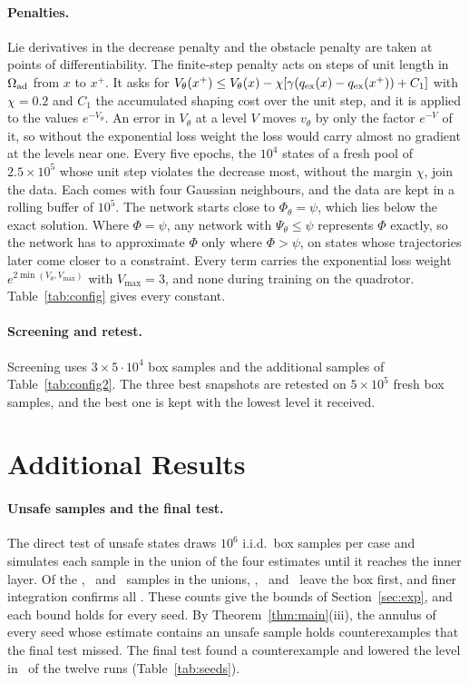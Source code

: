 \paragraph{Penalties.} Lie derivatives in the decrease penalty and the obstacle penalty are taken at points of differentiability. The finite-step penalty acts on steps of unit length in $\Omega_{\mathrm{ad}}$ from $x$ to $x^{+}$. It asks for $V_\theta(x^{+})\le V_\theta(x)-\chi[\gamma(q_{\mathrm{ex}}(x)-q_{\mathrm{ex}}(x^{+}))+C_1]$ with $\chi=0.2$ and $C_1$ the accumulated shaping cost over the unit step, and it is applied to the values $e^{-V_\theta}$. An error in $V_\theta$ at a level $V$ moves $v_\theta$ by only the factor $e^{-V}$ of it, so without the exponential loss weight the loss would carry almost no gradient at the levels near one. Every five epochs, the $10^4$ states of a fresh pool of $2.5\times10^5$ whose unit step violates the decrease most, without the margin $\chi$, join the data. Each comes with four Gaussian neighbours, and the data are kept in a rolling buffer of $10^5$. The network starts close to $\Phi_\theta=\psi$, which lies below the exact solution. Where $\Phi=\psi$, any network with $\Psi_\theta\le\psi$ represents $\Phi$ exactly, so the network has to approximate $\Phi$ only where $\Phi>\psi$, on states whose trajectories later come closer to a constraint. Every term carries the exponential loss weight $e^{2\min(V_\theta,V_{\max})}$ with $V_{\max}=3$, and none during training on the quadrotor. Table~\ref{tab:config} gives every constant.

\paragraph{Screening and retest.} Screening uses $3\times5\cdot10^4$ box samples and the additional samples of Table~\ref{tab:config2}. The three best snapshots are retested on $5\times10^5$ fresh box samples, and the best one is kept with the lowest level it received.


\section{Additional Results}\label{app:extra}
\paragraph{Unsafe samples and the final test.} The direct test of unsafe states draws $10^6$ i.i.d.\ box samples per case and simulates each sample in the union of the four estimates until it reaches the inner layer. Of the \resUnsafeInCirc, \resUnsafeInSin\ and \resUnsafeInQuad\ samples in the unions, \resUnsafeKCirc, \resUnsafeKSin\ and \resUnsafeKQuad\ leave the box first, and finer integration confirms all \resUnsafeConfirmed. These counts give the bounds of Section~\ref{sec:exp}, and each bound holds for every seed. By Theorem~\ref{thm:main}(iii), the annulus of every seed whose estimate contains an unsafe sample holds counterexamples that the final test missed. The final test found a counterexample and lowered the level in \resIidFailures\ of the twelve runs (Table~\ref{tab:seeds}).

